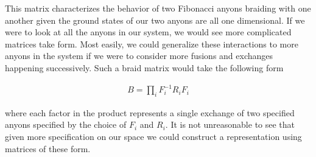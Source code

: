 \documentclass[10pt]{ucthesis}
\begin{document}
This matrix characterizes the behavior of two Fibonacci anyons braiding with one another given the ground states of our two anyons are all one dimensional. If we were to look at all the anyons in our system, we would see more complicated matrices take form. Most easily, we could generalize these interactions to more anyons in the system if we were to consider more fusions and exchanges happening successively. Such a braid matrix would take the following form

\begin{equation}
	\begin{aligned}
		B = \prod_i F_i^{-1}R_iF_i
	\end{aligned}
\end{equation}

where each factor in the product represents a single exchange of two specified anyons specified by the choice of $F_i$ and $R_i$. It is not unreasonable to see that given more specification on our space we could construct a representation using matrices of these form.






















\clearpage

%
%
\end{document}
